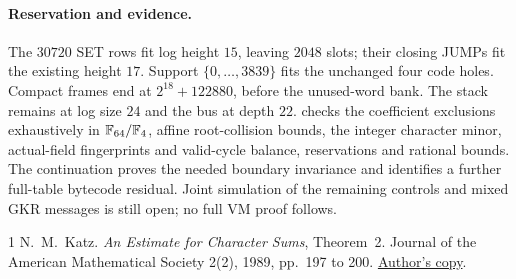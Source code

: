 \documentclass[11pt]{article}
\begin{document}
\paragraph{Reservation and evidence.} The $30720$ SET rows fit log height $15$, leaving $2048$ slots; their closing JUMPs fit the existing height $17$. Support $\{0,\ldots,3839\}$ fits the unchanged four code holes. Compact frames end at $2^{18}+122880$, before the unused-word bank. The stack remains at log size $24$ and the bus at depth $22$.  checks the coefficient exclusions exhaustively in $\mathbb{F}_{64}/\mathbb{F}_4$, affine root-collision bounds, the integer character minor, actual-field fingerprints and valid-cycle balance, reservations and rational bounds. The continuation  proves the needed boundary invariance and identifies a further full-table bytecode residual. Joint simulation of the remaining controls and mixed GKR messages is still open; no full VM proof follows.

\begin{thebibliography}{1}
 N.~M.~Katz. \emph{An Estimate for Character Sums}, Theorem~2. Journal of the American Mathematical Society 2(2), 1989, pp.~197 to 200. \href{https://web.math.princeton.edu/~nmk/old/estcharsums.pdf}{Author's copy}.
\end{thebibliography}
\end{document}
